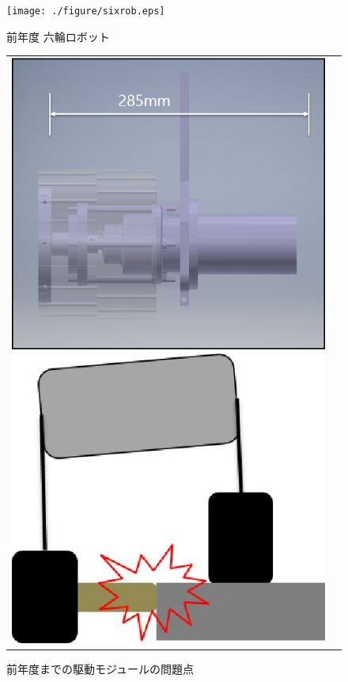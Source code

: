 \begin{figure}[hb]
	\centering
	\texttt{[image: ./figure/sixrob.eps]}
	\caption{前年度 六輪ロボット}
	\label{six_rober}
\end{figure}
\newpage
\begin{figure}[ht]
	\centering
	\begin{tabular}{cc}

		\begin{minipage}{0.5\hsize}
		\centering
		\includegraphics[clip,scale=0.5]{./figure/stac_cad.eps}
		\hspace{1.6cm}
		\end{minipage}

		\begin{minipage}{0.5\hsize}
		\centering
		\includegraphics[clip,scale=1.0]{./figure/stac_wheel.eps}
		\hspace{1.6cm}
		\end{minipage}

	\end{tabular}	
	\caption{前年度までの駆動モジュールの問題点}
	\label{problem}
\end{figure}

